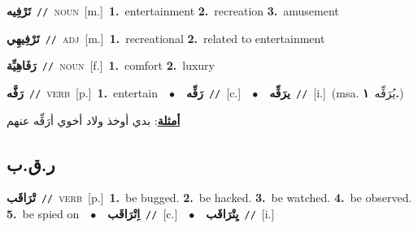 \documentclass[10pt,a4paper,twoside]{article} %
\begin{document}
\begin{multicols}{2}
{\setlength\topsep{0pt}\textbf{\foreignlanguage{arabic}{تَرْفِيه}}\ {\color{gray}\texttt{//}\color{black}}\ \textsc{noun}\ [m.]\ \textbf{1.}~entertainment  \textbf{2.}~recreation  \textbf{3.}~amusement\ } \vspace{2mm}

{\setlength\topsep{0pt}\textbf{\foreignlanguage{arabic}{تَرْفِيهِي}}\ {\color{gray}\texttt{//}\color{black}}\ \textsc{adj}\ [m.]\ \textbf{1.}~recreational  \textbf{2.}~related to entertainment\ } \vspace{2mm}

{\setlength\topsep{0pt}\textbf{\foreignlanguage{arabic}{رَفَاهِيِّة}}\ {\color{gray}\texttt{//}\color{black}}\ \textsc{noun}\ [f.]\ \textbf{1.}~comfort  \textbf{2.}~luxury\ } \vspace{2mm}

{\setlength\topsep{0pt}\textbf{\foreignlanguage{arabic}{رَفَّه}}\ {\color{gray}\texttt{//}\color{black}}\ \textsc{verb}\ [p.]\ \textbf{1.}~entertain\ \ $\bullet$\ \ \setlength\topsep{0pt}\textbf{\foreignlanguage{arabic}{رَفِّه}}\ {\color{gray}\texttt{//}\color{black}}\ [c.]\ \ $\bullet$\ \ \setlength\topsep{0pt}\textbf{\foreignlanguage{arabic}{يرَفِّه}}\ {\color{gray}\texttt{//}\color{black}}\ [i.]\ \color{gray}(msa. \foreignlanguage{arabic}{يُرَفِّه}~\foreignlanguage{arabic}{\textbf{١.}})\color{black}\  \begin{flushright}\color{gray}\foreignlanguage{arabic}{\textbf{\underline{\foreignlanguage{arabic}{أمثلة}}}: بدي أوخذ ولاد أخوي أرَفِّه عنهم}\end{flushright}\color{black}} \vspace{2mm}

\vspace{-3mm}
\subsection*{\color{blue}\foreignlanguage{arabic}{ر.ق.ب}\color{blue}{}} 

{\setlength\topsep{0pt}\textbf{\foreignlanguage{arabic}{تْرَاقَب}}\ {\color{gray}\texttt{//}\color{black}}\ \textsc{verb}\ [p.]\ \textbf{1.}~be bugged.  \textbf{2.}~be hacked.  \textbf{3.}~be watched.  \textbf{4.}~be observed.  \textbf{5.}~be spied on\ \ $\bullet$\ \ \setlength\topsep{0pt}\textbf{\foreignlanguage{arabic}{اِتْرَاقَب}}\ {\color{gray}\texttt{//}\color{black}}\ [c.]\ \ $\bullet$\ \ \setlength\topsep{0pt}\textbf{\foreignlanguage{arabic}{يِتْرَاقَب}}\ {\color{gray}\texttt{//}\color{black}}\ [i.]\ } \vspace{2mm}


\end{multicols}
\end{document}
